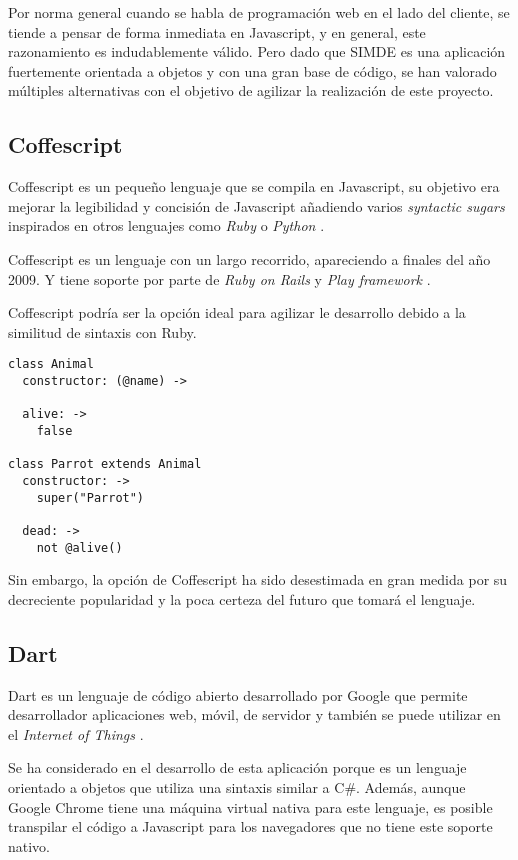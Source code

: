 Por norma general cuando se habla de programación web en el lado del cliente, se tiende a pensar
de forma inmediata en Javascript, y en general, este razonamiento es indudablemente válido. 
Pero dado que SIMDE es una aplicación fuertemente orientada a objetos y con una gran base de código, 
se han valorado múltiples alternativas con el objetivo de agilizar la realización de este proyecto.

\subsection{Coffescript}

Coffescript es un pequeño lenguaje que se compila en Javascript, su objetivo era mejorar la legibilidad 
y concisión de Javascript añadiendo varios \textit{syntactic sugars} inspirados en otros lenguajes como
\textit{Ruby} o \textit{Python} \cite{Coffescript}. 

\bigskip
Coffescript es un lenguaje con un largo recorrido, apareciendo a finales del año 2009. Y tiene soporte por
parte de \textit{Ruby on Rails} y \textit{Play framework} \cite{CoffescriptWiki}. 

\bigskip 
Coffescript podría ser la opción ideal para agilizar le desarrollo debido a la similitud de sintaxis con 
Ruby.

\begin{lstlisting}
class Animal
  constructor: (@name) ->

  alive: ->
    false

class Parrot extends Animal
  constructor: ->
    super("Parrot")

  dead: ->
    not @alive()
\end{lstlisting}

\bigskip
Sin embargo, la opción de Coffescript ha sido desestimada en gran medida por su decreciente popularidad
y la poca certeza del futuro que tomará el lenguaje.

\subsection{Dart}

Dart es un lenguaje de código abierto desarrollado por Google que permite desarrollador aplicaciones web, móvil, 
de servidor y también se puede utilizar en el \textit{Internet of Things} \cite{Dart}. 

\bigskip
Se ha considerado en el desarrollo de esta aplicación porque es un lenguaje orientado a objetos que utiliza una 
sintaxis similar a C\#. Además, aunque Google Chrome tiene una máquina virtual nativa para este lenguaje, es posible
transpilar el código a Javascript para los navegadores que no tiene este soporte nativo.


